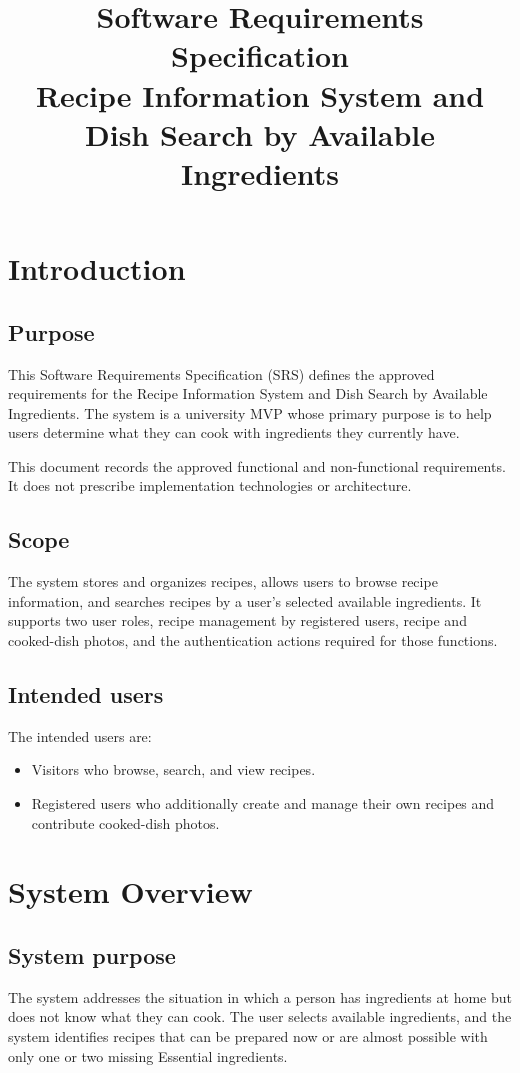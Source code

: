\documentclass[12pt]{article}
\title{Software Requirements Specification\\
Recipe Information System and Dish Search by Available Ingredients}
\author{}
\date{}
\begin{document}
\maketitle
\tableofcontents
\newpage

\section{Introduction}

\subsection{Purpose}
This Software Requirements Specification (SRS) defines the approved requirements for the Recipe Information System and Dish Search by Available Ingredients. The system is a university MVP whose primary purpose is to help users determine what they can cook with ingredients they currently have.

This document records the approved functional and non-functional requirements. It does not prescribe implementation technologies or architecture.

\subsection{Scope}
The system stores and organizes recipes, allows users to browse recipe information, and searches recipes by a user's selected available ingredients. It supports two user roles, recipe management by registered users, recipe and cooked-dish photos, and the authentication actions required for those functions.

\subsection{Intended users}
The intended users are:
\begin{itemize}
    \item Visitors who browse, search, and view recipes.
    \item Registered users who additionally create and manage their own recipes and contribute cooked-dish photos.
\end{itemize}

\section{System Overview}

\subsection{System purpose}
The system addresses the situation in which a person has ingredients at home but does not know what they can cook. The user selects available ingredients, and the system identifies recipes that can be prepared now or are almost possible with only one or two missing Essential ingredients.
\end{document}

